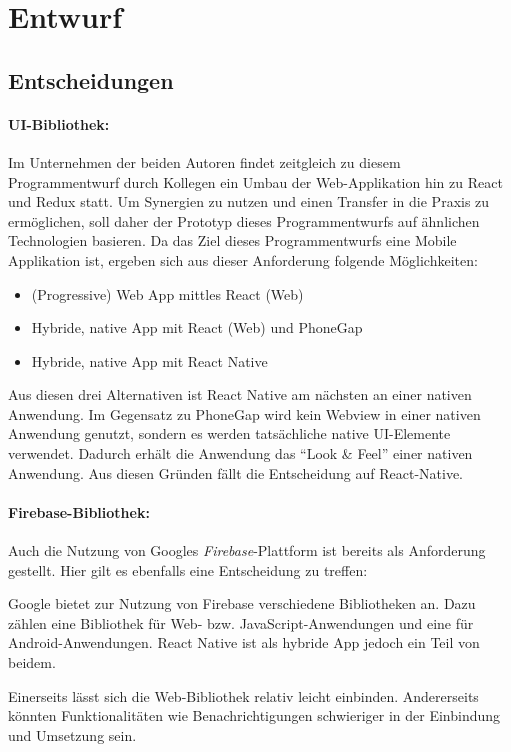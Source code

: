 \section{Entwurf}\label{sec:entwurf}

\subsection{Entscheidungen}
\paragraph{UI-Bibliothek:}
Im Unternehmen der beiden Autoren findet zeitgleich zu diesem Programmentwurf durch Kollegen ein Umbau der Web-Applikation hin zu React und Redux statt.
Um Synergien zu nutzen und einen Transfer in die Praxis zu ermöglichen, soll daher der Prototyp dieses Programmentwurfs auf ähnlichen Technologien basieren.
Da das Ziel dieses Programmentwurfs eine Mobile Applikation ist, ergeben sich aus dieser Anforderung folgende Möglichkeiten:
\begin{itemize}
    \item (Progressive) Web App mittles React (Web)
    \item Hybride, native App mit React (Web) und PhoneGap
    \item Hybride, native App mit React Native
\end{itemize}

Aus diesen drei Alternativen ist React Native am nächsten an einer nativen Anwendung.
Im Gegensatz zu PhoneGap wird kein Webview in einer nativen Anwendung genutzt,
sondern es werden tatsächliche native UI-Elemente verwendet.
Dadurch erhält die Anwendung das \enquote{Look \& Feel} einer nativen Anwendung. Aus diesen Gründen fällt die Entscheidung auf React-Native.

\paragraph{Firebase-Bibliothek:}
Auch die Nutzung von Googles \textit{Firebase}-Plattform ist bereits als Anforderung gestellt. Hier gilt es ebenfalls eine Entscheidung zu treffen:

Google bietet zur Nutzung von Firebase verschiedene Bibliotheken an.
Dazu zählen eine Bibliothek für Web- bzw. JavaScript-Anwendungen und eine für Android-Anwendungen.
React Native ist als hybride App jedoch ein Teil von beidem.

Einerseits lässt sich die Web-Bibliothek relativ leicht einbinden.
Andererseits könnten Funktionalitäten wie Benachrichtigungen schwieriger in der Einbindung und Umsetzung sein.

